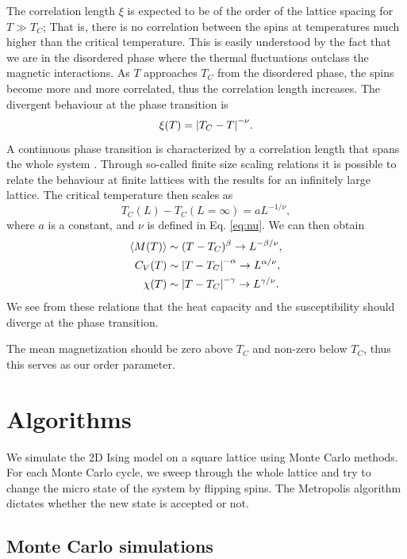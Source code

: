 \documentclass[%
 reprint,
nofootinbib,
aps,
]{revtex4-1}
\begin{document}
The correlation length $\xi$ is expected to be of the order of the lattice spacing for $T \gg T_C$; That is, there is no correlation between the spins at temperatures much higher than the critical temperature. This is easily understood by the fact that we are in the disordered phase where the thermal fluctuations outclass the magnetic interactions. As $T$ approaches $T_C$ from the disordered phase, the spins become more and more correlated, thus the correlation length increases. The divergent behaviour at the phase transition is
\begin{equation}\label{eq:nu}
\xi (T) = \abs{T_C - T}^{-\nu}.
\end{equation}
A continuous phase transition is characterized by a correlation length that spans the whole system \cite{hjorten}. Through so-called finite size scaling relations it is possible to relate the behaviour at finite lattices with the results for an infinitely large lattice. The critical temperature then scales as
\begin{equation}\label{eq:TCinfty}
T_C(L) - T_C(L = \infty) = aL^{-1/\nu},
\end{equation}
where $a$ is a constant, and $\nu$ is defined in Eq. \eqref{eq:nu}. We can then obtain
\begin{align}
\ev{M(T)} &\sim (T - T_C)^\beta \rightarrow L^{-\beta/\nu},\\
C_V(T) &\sim \abs{T - T_C}^{-\alpha} \rightarrow L^{\alpha/\nu},\\
\chi (T) &\sim \abs{T - T_C}^{-\gamma} \rightarrow L^{\gamma/\nu}.
\end{align}
We see from these relations that the heat capacity and the susceptibility should diverge at the phase transition.

The mean magnetization should be zero above $T_C$ and non-zero below $T_C$, thus this serves as our order parameter.


\section{Algorithms}

We simulate the 2D Ising model on a square lattice using Monte Carlo methods. For each Monte Carlo cycle, we sweep through the whole lattice and try to change the micro state of the system by flipping spins. The Metropolis algorithm dictates whether the new state is accepted or not.

\subsection{Monte Carlo simulations}
\end{document}

